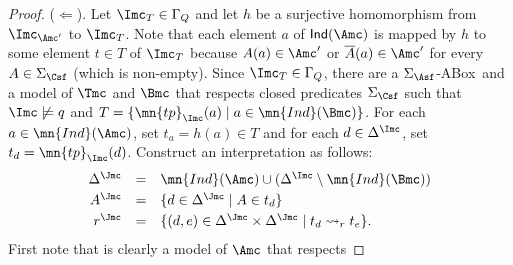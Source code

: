 \documentclass{lmcs}
\theoremstyle{definition}
\begin{document}
\begin{proof}
  \smallskip
  \noindent
  ($\Leftarrow$). Let $\Imc_T \in \Gamma_{Q}$ and let $h$ be a surjective
  homomorphism from $\Imc_{\Amc'}$ to $\Imc_T$. Note that each element $a$ of
  ${\sf Ind}(\Amc)$ is mapped by $h$ to some element $t \in T$ of $\Imc_T$ because
  $A(a) \in \Amc'$ or $\overline{A}(a) \in \Amc'$ for every $A \in
  \Sigma_{\Csf}$ (which is non-empty). Since $\Imc_T \in \Gamma_{Q}$,
  there are a $\Sigma_{\Asf}$-ABox~\Bmc and a model \Imc of $\Tmc$ and
  $\Bmc$ that respects closed predicates $\Sigma_{\Csf}$ such that
  $\Imc \not\models q$ and $ T = \{ \mn{tp}_\Imc(a) \mid a \in
  \mn{Ind}(\Bmc) \}$.
%
%
  For each $a \in \mn{Ind}(\Amc)$, set $t_a=h(a) \in T$ and for each
  $d \in \Delta^\Imc$, set $t_d=\mn{tp}_\Imc(d)$.  Construct an
  interpretation \Jmc as follows:
  $$
  \begin{array}{rcl}
    \Delta^\Jmc &=& \mn{Ind}(\Amc) \cup (\Delta^\Imc \setminus \mn{Ind}(\Bmc)) \\[1mm]
    A^\Jmc &=& \{ d \in \Delta^\Jmc \mid A \in t_d \} \\[1mm]
    r^\Jmc &=& \{ (d,e) \in \Delta^\Jmc \times \Delta^\Jmc \mid
    t_d\rightsquigarrow_r t_e\}.
  \end{array}
  $$
  First note that \Jmc is clearly a model of $\Amc$ that respects

\end{proof}
\end{document}
